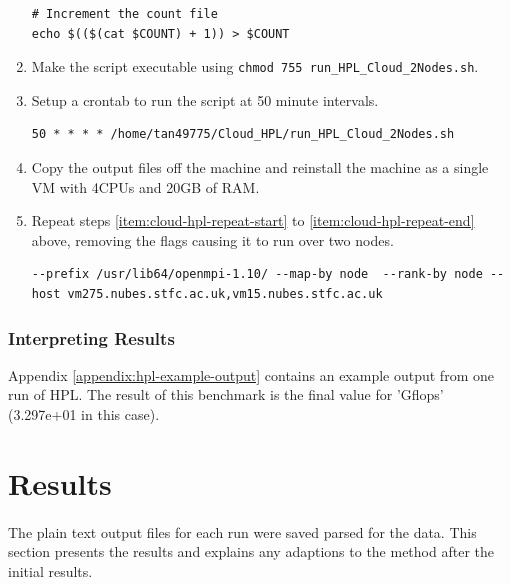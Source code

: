 \documentclass{article}
\newenvironment{code}{\captionsetup{type=listing}}{}
\begin{document}
\begin{enumerate}
\begin{code}
\begin{verbatim}
# Increment the count file
echo $(($(cat $COUNT) + 1)) > $COUNT
                    \end{verbatim}
                    \end{code}

                \item Make the script executable using \texttt{chmod 755 run_HPL_Cloud_2Nodes.sh}.
                \item \label{item:cloud-hpl-repeat-end} Setup a crontab to run the script at 50 minute intervals.

                    \begin{verbatim}
50 * * * * /home/tan49775/Cloud_HPL/run_HPL_Cloud_2Nodes.sh
                    \end{verbatim}
                \item Copy the output files off the machine and reinstall the machine as a single VM with 4CPUs and 20GB of RAM.

                \item \label{item:cloud-hpl-one-vm} Repeat steps \ref{item:cloud-hpl-repeat-start} to \ref{item:cloud-hpl-repeat-end} above, removing the flags causing it to run over two nodes.

                \begin{verbatim}
--prefix /usr/lib64/openmpi-1.10/ --map-by node  --rank-by node --host vm275.nubes.stfc.ac.uk,vm15.nubes.stfc.ac.uk
                \end{verbatim}

            \end{enumerate}


        \subsubsection{Interpreting Results}
            Appendix \ref{appendix:hpl-example-output} contains an example output from one run of HPL. The result of this benchmark is the final value for 'Gflops' (3.297e+01 in this case).


\section{Results}
    \paragraph{} The plain text output files for each run were saved parsed for the data. This section presents the results and explains any adaptions to the method after the initial results.
\end{document}
